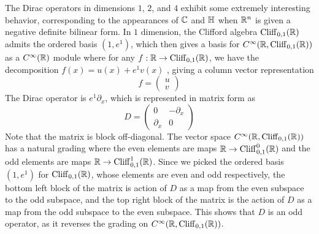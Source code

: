 The Dirac operators in dimensions $1$, $2$, and $4$ exhibit some extremely
interesting behavior, corresponding to the appearances of $\mathbb{C}$ and $\mathbb{H}$
when $\mathbb{R}^n$ is given a negative definite bilinear form. In $1$ dimension,
the Clifford algebra $\operatorname{Cliff}_{0,1}(\mathbb{R})$ admits the ordered basis $(1,e^1)$, which
then gives a basis for $C^\infty(\mathbb{R}, \operatorname{Cliff}_{0,1}(\mathbb{R}))$ as a
$C^\infty(\mathbb{R})$ module where for any $f : \mathbb{R} \to \operatorname{Cliff}_{0,1}(\mathbb{R})$, we have the
decomposition $f(x) = u(x) + e^1 v(x)$ , giving a column vector representation
\[
 f = \begin{pmatrix}
 u \\
 v
 \end{pmatrix}
\]
The Dirac operator is $e^1\partial_x$, which is represented in matrix form as
\[
 D = \begin{pmatrix}
 0 & -\partial_x \\
 \partial_x & 0
 \end{pmatrix}
\]
Note that the matrix is block off-diagonal. The vector space
$C^\infty(\mathbb{R}, \operatorname{Cliff}_{0,1}(\mathbb{R}))$ has a natural grading where the even elements
are maps $\mathbb{R} \to \operatorname{Cliff}_{0,1}^0(\mathbb{R})$ and the odd elements are maps
$\mathbb{R} \to \operatorname{Cliff}_{0,1}^1(\mathbb{R})$. Since we picked the ordered basis $(1,e^1)$
for $\operatorname{Cliff}_{0,1}(\mathbb{R})$, whose elements are even and odd respectively, the bottom
left block of the matrix is action of $D$ as a map from the even subspace to
the odd subspace, and the top right block of the matrix is the action of $D$
as a map from the odd subspace to the even subspace.
This shows that $D$ is an odd operator, as it reverses the grading on
$C^\infty(\mathbb{R}, \operatorname{Cliff}_{0,1}(\mathbb{R}))$. \\


